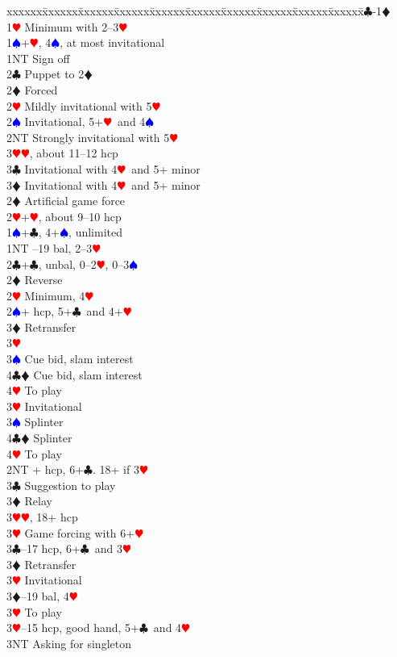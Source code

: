 \documentclass[a4paper]{article}
\newcommand{\BC}{\textcolor{OliveGreen}{$\clubsuit$}}
\newcommand{\BD}{\textcolor{RedOrange}{$\vardiamondsuit$}}
\newcommand{\BH}{\textcolor{Red}{$\varheartsuit${}}}
\newcommand{\BS}{\textcolor{Blue}{$\spadesuit${}}}
\newenvironment{bidtable}
{\begin{tabbing}

xxxxxx\=xxxxxx\=xxxxxx\=xxxxxx\=xxxxxx\=xxxxxx\=xxxxxx\=xxxxxx\=xxxxxx\=xxxxxx\=\kill}
{\end{tabbing} }%
\begin{document}
\begin{bidtable}
1\BC-1\BD\+\\
1\BH \> Minimum with 2--3\BH \+\\
1\BS {}+\BH , 4\BS , at most invitational\\
1NT \> Sign off\\
2\BC \> Puppet to 2\BD \+\\
2\BD \> Forced\+\\
2\BH \> Mildly invitational with 5\BH \\
2\BS \> Invitational, 5+\BH\ and 4\BS \\
2NT \> Strongly invitational with 5\BH \\
3\BH {}\BH , about 11--12 hcp\\
3\BC \> Invitational with 4\BH\ and 5+ minor\\
3\BD \> Invitational with 4\BH\ and 5+ minor\-\-\\
2\BD \> Artificial game force\\
2\BH {}+\BH , about 9--10 hcp\-\\
1\BS {}+\BC , 4+\BS , unlimited\\
1NT --19 bal, 2--3\BH \\
2\BC {}+\BC , unbal, 0--2\BH , 0--3\BS \\
2\BD \> Reverse\\
2\BH \> Minimum, 4\BH \\
2\BS {}+ hcp, 5+\BC\ and 4+\BH \+\\
3\BD \> Retransfer\+\\
3\BH\+\\
3\BS \> Cue bid, slam interest\\
4\BC\BD \> Cue bid, slam interest\\
4\BH \> To play\-\-\\
3\BH \> Invitational\\
3\BS \> Splinter\\
4\BC\BD \> Splinter\\
4\BH \> To play\-\\
2NT + hcp, 6+\BC . 18+ if 3\BH \+\\
3\BC \> Suggestion to play\\
3\BD \> Relay\+\\
3\BH {}\BH , 18+ hcp\-\\
3\BH \> Game forcing with 6+\BH \-\\
3\BC {}--17 hcp, 6+\BC\ and 3\BH \+\\
3\BD \> Retransfer\\
3\BH \> Invitational\-\\
3\BD {}--19 bal, 4\BH \+\\
3\BH \> To play\-\\
3\BH {}--15 hcp, good hand, 5+\BC\ and 4\BH \+\\
3NT \> Asking for singleton\-\-
\end{bidtable}
\end{document}
